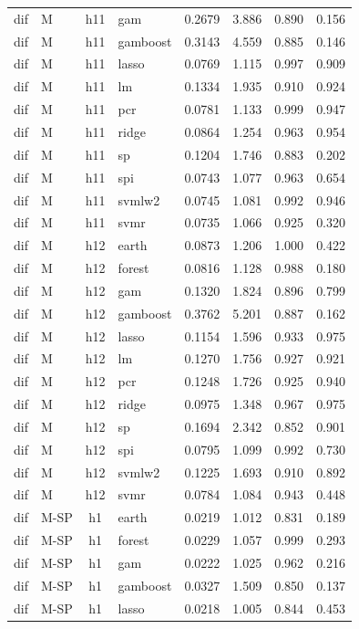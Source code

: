 \begin{ThreePartTable}
\begin{longtable}[t]{llclcccc}
dif & M & h11 & gam & 0.2679 & 3.886 & 0.890 & 0.156\\
dif & M & h11 & gamboost & 0.3143 & 4.559 & 0.885 & 0.146\\
dif & M & h11 & lasso & 0.0769 & 1.115 & 0.997 & 0.909\\
dif & M & h11 & lm & 0.1334 & 1.935 & 0.910 & 0.924\\
dif & M & h11 & pcr & 0.0781 & 1.133 & 0.999 & 0.947\\
dif & M & h11 & ridge & 0.0864 & 1.254 & 0.963 & 0.954\\
dif & M & h11 & sp & 0.1204 & 1.746 & 0.883 & 0.202\\
dif & M & h11 & spi & 0.0743 & 1.077 & 0.963 & 0.654\\
dif & M & h11 & svmlw2 & 0.0745 & 1.081 & 0.992 & 0.946\\
dif & M & h11 & svmr & 0.0735 & 1.066 & 0.925 & 0.320\\
\addlinespace
dif & M & h12 & earth & 0.0873 & 1.206 & 1.000 & 0.422\\
dif & M & h12 & forest & 0.0816 & 1.128 & 0.988 & 0.180\\
dif & M & h12 & gam & 0.1320 & 1.824 & 0.896 & 0.799\\
dif & M & h12 & gamboost & 0.3762 & 5.201 & 0.887 & 0.162\\
dif & M & h12 & lasso & 0.1154 & 1.596 & 0.933 & 0.975\\
dif & M & h12 & lm & 0.1270 & 1.756 & 0.927 & 0.921\\
dif & M & h12 & pcr & 0.1248 & 1.726 & 0.925 & 0.940\\
dif & M & h12 & ridge & 0.0975 & 1.348 & 0.967 & 0.975\\
dif & M & h12 & sp & 0.1694 & 2.342 & 0.852 & 0.901\\
dif & M & h12 & spi & 0.0795 & 1.099 & 0.992 & 0.730\\
dif & M & h12 & svmlw2 & 0.1225 & 1.693 & 0.910 & 0.892\\
dif & M & h12 & svmr & 0.0784 & 1.084 & 0.943 & 0.448\\
\addlinespace
dif & M-SP & h1 & earth & 0.0219 & 1.012 & 0.831 & 0.189\\
dif & M-SP & h1 & forest & 0.0229 & 1.057 & 0.999 & 0.293\\
dif & M-SP & h1 & gam & 0.0222 & 1.025 & 0.962 & 0.216\\
dif & M-SP & h1 & gamboost & 0.0327 & 1.509 & 0.850 & 0.137\\
dif & M-SP & h1 & lasso & 0.0218 & 1.005 & 0.844 & 0.453\\

\end{longtable}
\end{ThreePartTable}
